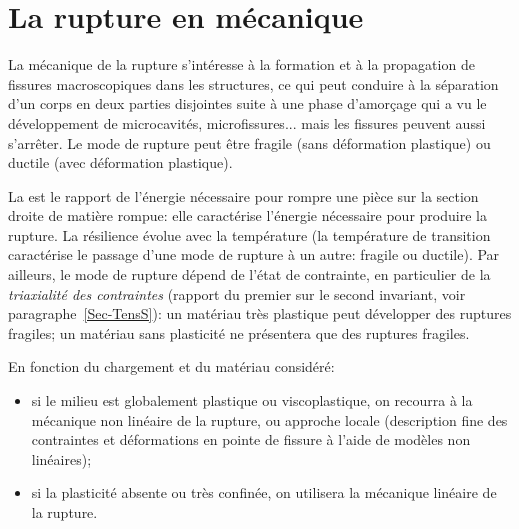 \chapter{La rupture en mécanique}\label{Ch-rupt}

La mécanique de la rupture s'intéresse à la formation et à la propagation de fissures macroscopiques dans les structures, ce qui peut conduire à la séparation d'un corps en deux parties disjointes suite à une phase d'amorçage qui a vu le développement de microcavités, microfissures... mais les fissures peuvent aussi s'arrêter. Le mode de rupture peut être fragile (sans déformation plastique) ou ductile (avec déformation plastique).

\medskip
La  est le rapport de l'énergie nécessaire pour rompre une pièce sur la section droite de matière rompue: elle caractérise l'énergie nécessaire pour produire la rupture. La résilience évolue avec la température (la température de transition caractérise le passage d'une mode de rupture à un autre: fragile ou ductile). Par ailleurs, le mode de rupture dépend de l'état de contrainte, en particulier de la \emph{triaxialité des contraintes} (rapport du premier sur le second invariant, voir paragraphe~\ref{Sec-TensS}): un matériau très plastique peut développer des ruptures fragiles; un matériau sans plasticité ne présentera que des ruptures fragiles.

\medskip
En fonction du chargement et du matériau considéré:
\begin{itemize}
  \item si le milieu est globalement plastique ou viscoplastique, on recourra à la mécanique non linéaire de la rupture, ou approche locale (description fine des contraintes et déformations en pointe de fissure à l'aide de modèles non linéaires);
  \item si la plasticité absente ou très confinée, on utilisera la mécanique linéaire de la rupture.
\end{itemize}

%
%





